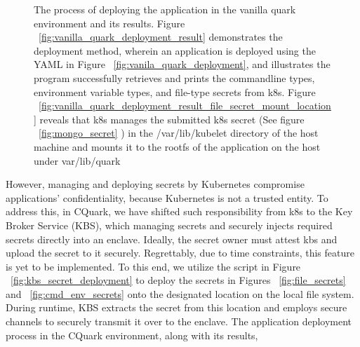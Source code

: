 \begin{figure}[H]

    
    
    \caption{The process of deploying the application in the vanilla quark environment and its results. Figure ~\ref{fig:vanilla_quark_deployment_result} demonstrates the deployment method, wherein an application is deployed using the YAML in Figure ~\ref{fig:vanila_quark_deployment}, and illustrates the program successfully retrieves and 
    prints the command\-line types, environment variable types, and file-type secrets from k8s. Figure ~\ref{fig:vanilla_quark_deployment_result_file_secret_mount_location} reveals that k8s manages the submitted k8s secret (See figure ~\ref{fig:mongo_secret} ) in the /var/lib/kubelet directory of 
    the host machine and mounts it to the rootfs of the application on the host under var/lib/quark}
    
\end{figure}
However, managing and deploying secrets by Kubernetes compromise applications’ confidentiality, because  Kubernetes is not a trusted entity. To address this, in CQuark, we have shifted such responsibility from k8s to the Key Broker Service (KBS), which managing secrets and securely injects 
required secrets directly into an enclave. Ideally, the secret owner must attest kbs and upload the secret to it securely. Regrettably, due to time constraints, this feature is yet to be implemented. To this end, we utilize the script in Figure ~\ref{fig:kbs_secret_deployment} to deploy the 
secrets in Figures ~\ref{fig:file_secrets} and ~\ref{fig:cmd_env_secrets} onto the designated location on the local file system. During runtime, KBS extracts the secret from this location and employs secure channels to securely transmit it over to the enclave. The application deployment process in the CQuark environment, along with its results, 

